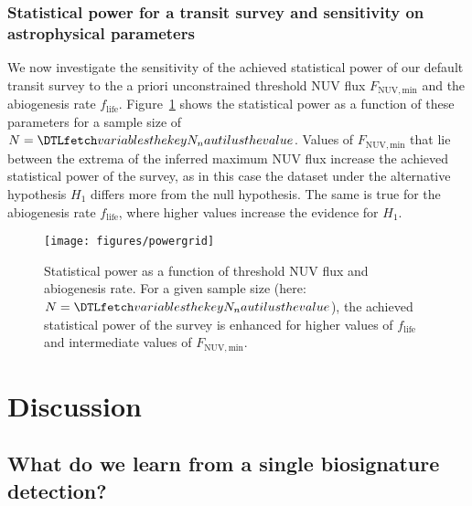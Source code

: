 \documentclass[modern,linenumbers]{aastex631}
\begin{document}
\subsubsection{Statistical power for a transit survey and sensitivity on astrophysical parameters}
We now investigate the sensitivity of the achieved statistical power of our default transit survey to the a priori unconstrained threshold \gls{NUV} flux $F_\mathrm{NUV, min}$ and the abiogenesis rate $f_\mathrm{life}$.
Figure~\ref{fig:powergrid} shows the statistical power as a function of these parameters for a sample size of $N=\var{N_nautilus}$.
Values of $F_\mathrm{NUV, min}$ that lie between the extrema of the inferred maximum \gls{NUV} flux increase the achieved statistical power of the survey, as in this case the dataset under the alternative hypothesis $H_1$ differs more from the null hypothesis.
The same is true for the abiogenesis rate $f_\mathrm{life}$, where higher values increase the evidence for $H_1$.

\begin{figure}
    \begin{centering}
        \texttt{[image: figures/powergrid]}
        \caption{Statistical power as a function of threshold \gls{NUV} flux and abiogenesis rate. For a given sample size (here: $N=\var{N_nautilus}$), the achieved statistical power of the survey is enhanced for higher values of $f_\mathrm{life}$ and intermediate values of $F_\mathrm{NUV, min}$.}
        \label{fig:powergrid}
    \end{centering}
\end{figure}



\section{Discussion}
\label{sec:discussion}

\subsection{What do we learn from a single biosignature detection?}
\end{document}
